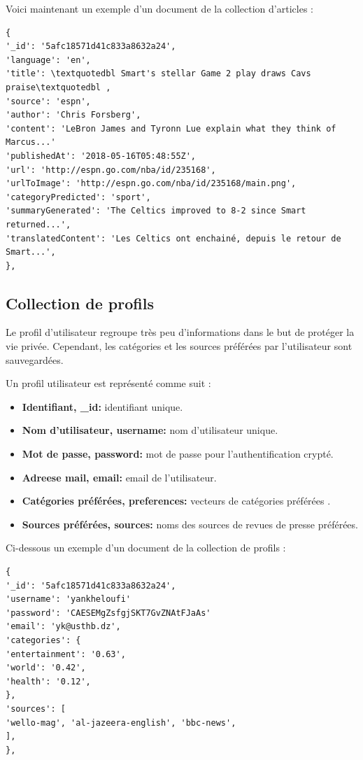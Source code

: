 Voici maintenant un exemple d'un document de la collection d'articles :
\begin{lstlisting}[style=code]
{
'_id': '5afc18571d41c833a8632a24', 
'language': 'en',
'title': \textquotedbl Smart's stellar Game 2 play draws Cavs praise\textquotedbl , 
'source': 'espn', 
'author': 'Chris Forsberg', 
'content': 'LeBron James and Tyronn Lue explain what they think of Marcus...'
'publishedAt': '2018-05-16T05:48:55Z', 
'url': 'http://espn.go.com/nba/id/235168',
'urlToImage': 'http://espn.go.com/nba/id/235168/main.png',  
'categoryPredicted': 'sport', 
'summaryGenerated': 'The Celtics improved to 8-2 since Smart returned...', 
'translatedContent': 'Les Celtics ont enchainé, depuis le retour de Smart...', 
},
\end{lstlisting}

\subsection{Collection de profils}
Le profil d'utilisateur regroupe très peu d'informations dans le but de protéger la vie privée. Cependant, les catégories et les sources préférées par l'utilisateur sont sauvegardées. 

Un profil utilisateur est représenté comme suit :
\begin{itemize}
    \item \textbf{Identifiant, \textquotedbl  \_id\textquotedbl : } identifiant unique.
    \item \textbf{Nom d'utilisateur, \textquotedbl  username\textquotedbl : } nom d'utilisateur unique.
    \item \textbf{Mot de passe, \textquotedbl  password\textquotedbl : } mot de passe pour l'authentification crypté.
    \item \textbf{Adreese mail, \textquotedbl  email\textquotedbl : } email de l'utilisateur.
    \item \textbf{Catégories préférées, \textquotedbl  preferences\textquotedbl : } vecteurs de catégories préférées .
    \item \textbf{Sources préférées, \textquotedbl  sources\textquotedbl : } noms des sources de revues de presse préférées. 
\end{itemize}

Ci-dessous un exemple d'un document de la collection de profils :
\begin{lstlisting}[style=code]
{
'_id': '5afc18571d41c833a8632a24', 
'username': 'yankheloufi'
'password': 'CAESEMgZsfgjSKT7GvZNAtFJaAs'
'email': 'yk@usthb.dz',
'categories': {
'entertainment': '0.63',
'world': '0.42',
'health': '0.12',
},
'sources': [
'wello-mag', 'al-jazeera-english', 'bbc-news', 
],
},
\end{lstlisting}


